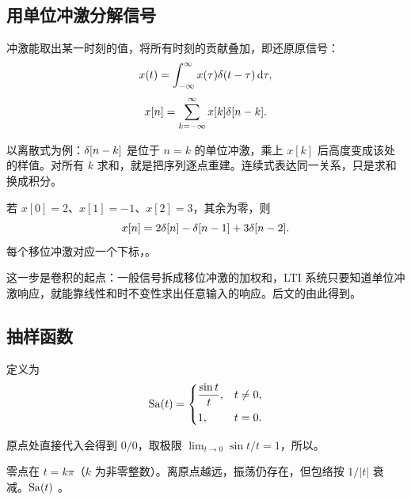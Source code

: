 \subsection{用单位冲激分解信号}

冲激能取出某一时刻的值，将所有时刻的贡献叠加，即还原原信号：
\begin{equation}
  x(t)=\int_{-\infty}^{\infty}
    x(\tau)\delta(t-\tau)\mathop{}\!\mathrm{d}\tau,
  \label{eq:ct-impulse-decomposition}
\end{equation}
\begin{equation}
  x[n]=\sum_{k=-\infty}^{\infty}
    x[k]\delta[n-k].
  \label{eq:dt-impulse-decomposition}
\end{equation}

以离散式为例：$\delta[n-k]$ 是位于 $n=k$ 的单位冲激，乘上 $x[k]$ 后高度变成该处的样值。对所有 $k$ 求和，就是把序列逐点重建。连续式表达同一关系，只是求和换成积分。

\begin{example}[用冲激表示有限长序列]
  若 $x[0]=2$、$x[1]=-1$、$x[2]=3$，其余为零，则
  \[
    x[n]=2\delta[n]-\delta[n-1]+3\delta[n-2].
  \]
  每个移位冲激对应一个下标，。
\end{example}

这一步是卷积的起点：一般信号拆成移位冲激的加权和，LTI 系统只要知道单位冲激响应，就能靠线性和时不变性求出任意输入的响应。后文的由此得到。

\subsection{抽样函数}
\label{subsec:sampling-function}

\begin{definition}[抽样函数]
  \label{def:sampling-function}
  定义为
  \begin{equation}
    \operatorname{Sa}(t)=
    \begin{cases}
      \dfrac{\sin t}{t},&t\ne0,\\[0.6em]
      1,&t=0.
    \end{cases}
    \label{eq:sampling-function}
  \end{equation}
\end{definition}

原点处直接代入会得到 $0/0$，取极限 $\lim_{t\to0}\sin t/t=1$，所以。

零点在 $t=k\pi$（$k$ 为非零整数）。离原点越远，振荡仍存在，但包络按 $1/|t|$ 衰减。$\operatorname{Sa}(t)$ 。

